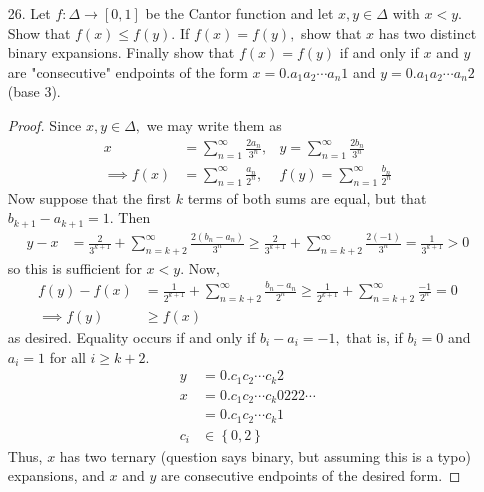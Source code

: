 \documentclass{article}
\begin{document}
\begin{itemize}
\begin{proof}
			Case 1: $a_i=0$ for all $i\ge k$ for some $k,$ in which case $x$ ends with 2. 

			Case 2: $a_i=2$ for all $i\ge k$ for some $k,$ in which case $x$ ends with 1. 

			Thus, $x$ must take on the desired form.
		\end{proof}

	\item[26.] Let $f:\Delta\to [0, 1]$ be the Cantor function and let $x, y\in \Delta$ with $x<y.$ Show that $f(x)\le f(y).$ If $f(x)=f(y),$ show that $x$ has two distinct binary expansions. Finally show that $f(x)=f(y)$ if and only if $x$ and $y$ are "consecutive" endpoints of the form $x=0.a_1a_2\cdots a_n1$ and $y=0.a_1a_2\cdots a_n2$ (base 3).
		\begin{proof}
			Since $x, y\in \Delta,$ we may write them as
			\begin{align*}
				x &= \sum_{n=1}^{\infty} \frac{2a_n}{3^n}, & y=\sum_{n=1}^{\infty} \frac{2b_n}{3^n} \\
				\implies f(x) &= \sum_{n=1}^{\infty} \frac{a_n}{2^n}, & f(y) = \sum_{n=1}^{\infty}\frac{b_n}{2^n}
			\end{align*}
			Now suppose that the first $k$ terms of both sums are equal, but that $b_{k+1}-a_{k+1}=1.$ Then
			\begin{align*}
				y-x &= \frac{2}{3^{k+1}} + \sum_{n=k+2}^{\infty} \frac{2(b_n-a_n)}{3^n} \ge \frac{2}{3^{k+1}} + \sum_{n=k+2}^{\infty} \frac{2(-1)}{3^n} = \frac{1}{3^{k+1}} > 0
			\end{align*}
			so this is sufficient for $x<y.$ Now, 
			\begin{align*}
				f(y)-f(x) &= \frac{1}{2^{k+1}} + \sum_{n=k+2}^{\infty}\frac{b_n-a_n}{2^n} \ge \frac{1}{2^{k+1}} + \sum_{n=k+2}^{\infty} \frac{-1}{2^n} = 0 \\
				\implies f(y)&\ge f(x)
			\end{align*}
			as desired. Equality occurs if and only if $b_i-a_i=-1,$ that is, if $b_i=0$ and $a_i=1$ for all $i\ge k+2.$
			\begin{align*}
				y &= 0.c_1c_2\cdots c_k2 \\
				x &= 0.c_1c_2\cdots c_k 0222\cdots \\
				&= 0.c_1c_2\cdots c_k 1 \\
				c_i &\in \left\{ 0, 2 \right\}
			\end{align*}
			Thus, $x$ has two ternary (question says binary, but assuming this is a typo) expansions, and $x$ and $y$ are consecutive endpoints of the desired form.
		\end{proof}


\end{itemize}
\end{document}
